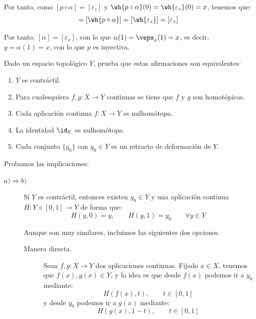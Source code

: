 \begin{ejercicio}
\begin{description}
\begin{description}
            Por tanto, como $[p\circ \alpha] = [\varepsilon_z]$ y $\wh{p\circ \alpha}(0) = \wh{\varepsilon_z}(0) = x$, tenemos que:
            \begin{equation*}
                [\alpha] = [\wh{p\circ \alpha}] = [\wh{\varepsilon_z}] = [\varepsilon_x]
            \end{equation*}
        \end{description}
    \end{description}

    Por tanto, $[\alpha] = [\varepsilon_x]$, con lo que $\alpha(1) = \veps_x(1) = x$, es decir, $y = \alpha(1) = x$, con lo que $p$ es inyectiva.
\end{ejercicio}

\begin{ejercicio}\label{ej:Contractil}
    Dado un espacio topológico $Y$, prueba que estas afirmaciones son equivalentes:
    \begin{enumerate}[label=\alph*)]
        \item $Y$ es contráctil.
        \item Para cualesquiera $f,g:X\to Y$ continuas se tiene que $f$ y $g$ son homotópicas.
        \item Cada aplicación continua $f:X\to Y$ es nulhomótopa.
        \item La identidad $\id_Y$ es nulhomótopa.
        \item Cada conjunto $\{y_0\}$ con $y_0\in Y$ es un retracto de deformación de $Y$.
    \end{enumerate}
    Probamos las implicaciones:
    \begin{description}
        \item [$a)\Longrightarrow b)$] Si $Y$ es contráctil, entonces existen $y_0\in Y$ y una aplicación continua $H:Y\times [0,1]\to Y$ de forma que:
            \begin{equation*}
                H(y,0) = y, \qquad H(y,1) = y_0 \qquad \forall y\in Y
            \end{equation*}

            Aunque son muy similares, incluimos las siguientes dos opciones.
            \begin{description}
                \item[Manera directa.] Sean $f,g:X\to Y$ dos aplicaciones continuas. Fijado $x\in X$, tenemos que $f(x),g(x)\in Y$, y la idea es que desde $f(x)$ podemos ir a $y_0$ mediante:
                \begin{equation*}
                    H(f(x),t), \qquad t\in [0,1]
                \end{equation*}
                y desde $y_0$ podemos ir a $g(x)$ mediante:
                \begin{equation*}
                    H(g(x),1-t), \qquad t\in [0,1]
                \end{equation*}


\end{description}
\end{description}
\end{ejercicio}
